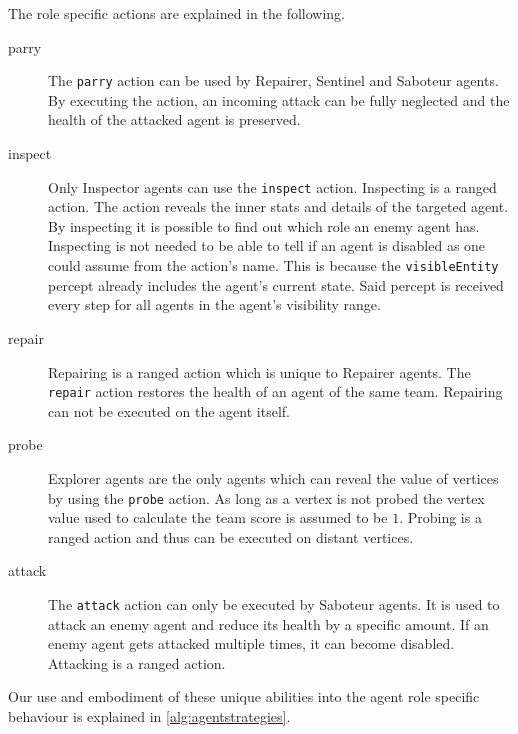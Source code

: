 The role specific actions are explained in the following.
\begin{description}
   \item[parry] The \texttt{parry} action can be used by Repairer, Sentinel and Saboteur agents.
    By executing the action, an incoming attack can be fully neglected and the health of the attacked agent is preserved.
   \item[inspect] Only Inspector agents can use the \texttt{inspect} action.
    Inspecting is a ranged action.
    The action reveals the inner stats and details of the targeted agent.
    By inspecting it is possible to find out which role an enemy agent has.
    Inspecting is not needed to be able to tell if an agent is disabled as one could assume from the action's name.
    This is because the \texttt{visibleEntity} percept already includes the agent's current state.
    Said percept is received every step for all agents in the agent's visibility range.
   \item[repair] Repairing is a ranged action which is unique to Repairer agents.
    The \texttt{repair} action restores the health of an agent of the same team.
    Repairing can not be executed on the agent itself.
   \item[probe] Explorer agents are the only agents which can reveal the value of vertices by using the \texttt{probe} action.
    As long as a vertex is not probed the vertex value used to calculate the team score is assumed to be $1$.
    Probing is a ranged action and thus can be executed on distant vertices.
   \item[attack] The \texttt{attack} action can only be executed by Saboteur agents.
     It is used to attack an enemy agent and reduce its health by a specific amount.
     If an enemy agent gets attacked multiple times, it can become disabled.
     Attacking is a ranged action.
\end{description}

Our use and embodiment of these unique abilities into the agent role specific behaviour is explained in \autoref{alg:agentstrategies}.
